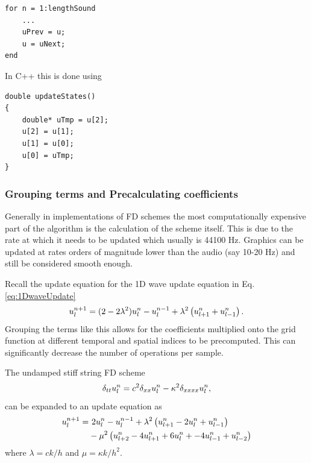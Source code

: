 \setlstMAT
\begin{lstlisting}
for n = 1:lengthSound
    ...
    uPrev = u;
    u = uNext;
end
\end{lstlisting}



In C++ this is done using
\setlstCpp
\begin{lstlisting}[caption=Implementation of a pointer switch also shown in Figure \ref{fig:pointerSwitch}. A temporary pointer is assigned to where the $\u^{n-1}$ pointer is currently pointing at to be able to assign that location in memory to the $\u^{n+1}$ pointer in the end., label=lst:cppPointer]
double updateStates()
{
    double* uTmp = u[2];
    u[2] = u[1];
    u[1] = u[0];
    u[0] = uTmp;
}
\end{lstlisting}

\subsubsection{Grouping terms and Precalculating coefficients}
Generally in implementations of FD schemes the most computationally expensive part of the algorithm is the calculation of the scheme itself. This is due to the rate at which it needs to be updated which usually is 44100 Hz. Graphics can be updated at rates orders of magnitude lower than the audio (say 10-20 Hz) and still be considered smooth enough.

Recall the update equation for the 1D wave update equation in Eq. \eqref{eq:1DwaveUpdate}
\begin{equation*}
    u_l^{n+1} = (2 - 2 \lambda^2) u_l^n - u_l^{n-1} + \lambda^2\left(u_{l+1}^n + u_{l-1}^n\right).
\end{equation*}
Grouping the terms like this allows for the coefficients multiplied onto the grid function at different temporal and spatial indices to be precomputed. This can significantly decrease the number of operations per sample.

The undamped stiff string FD scheme%
\begin{equation}
    \delta_{tt} u_l^n = c^2 \delta_{xx} u_l^n - \kappa^2 \delta_{xxxx} u_l^n,
\end{equation}
can be expanded to an update equation as
\begin{equation}
    \begin{aligned}
        u_l^{n+1} = &\ 2u_l^n - u_l^{n-1} + \lambda^2 \left(u_{l+1}^n - 2u_l^n + u_{l-1}^n\right)\\
        & - \mu^2 \left(u_{l+2}^n - 4u_{l+1}^n + 6u_l^n + -4u_{l-1}^n + u_{l-2}^n\right)
    \end{aligned}
\end{equation}
where $\lambda = ck/h$ and $\mu = \kappa k / h^2$.

